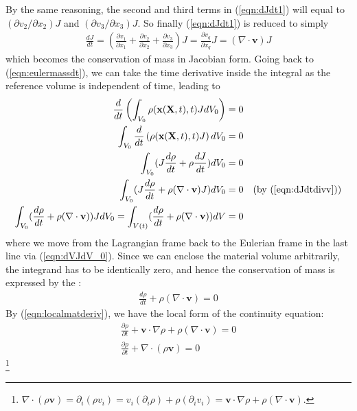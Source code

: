 By the same reasoning, the second and third terms in (\ref{eqn:dJdt1}) will equal to
$(\partial v_2/\partial x_2)J$ and $(\partial v_3/\partial x_3)J$. So finally (\ref{eqn:dJdt1}) is reduced to simply
\begin{align}
\frac{dJ}{dt} = \left(\frac{\partial v_1}{\partial x_1} + \frac{\partial v_2}{\partial x_2} + \frac{\partial v_3}{\partial x_3}\right) J = \frac{\partial v_q}{\partial x_q} J = (\nabla \cdot \textbf{v}) J \label{eqn:dJdtdivv}
\end{align}
which becomes the conservation of mass in Jacobian form. Going back to (\ref{eqn:eulermassdt}), we can take the time derivative inside the integral as the reference volume is independent of time, leading to
\begin{align}
\frac{d}{dt}\left(\int_{V_0} \rho(\textbf{x}(\textbf{X},t),t) JdV_0 \right) &= 0 \nonumber \\
\int_{V_0} \frac{d}{dt}\left(\rho(\textbf{x}(\textbf{X},t),t)J\right) dV_0  &= 0 \nonumber \\
\int_{V_0} (J \frac{d\rho}{dt} + \rho\frac{dJ}{dt}) dV_0 &= 0 \nonumber \\
\int_{V_0} (J \frac{d\rho}{dt} + \rho(\nabla \cdot \textbf{v})J) dV_0 &= 0 &\text{(by (\ref{eqn:dJdtdivv}))} \nonumber \\
\int_{V_0} (\frac{d\rho}{dt} + \rho(\nabla \cdot \textbf{v})) JdV_0 = \int_{V(t)}(\frac{d\rho}{dt} + \rho(\nabla \cdot \textbf{v}))dV &= 0
\end{align}
where we move from the Lagrangian frame back to the Eulerian frame in the last line via (\ref{eqn:dVJdV_0}). Since we can enclose the material volume arbitrarily, the integrand has to be identically zero, and hence the conservation of mass is expressed by the :
\begin{align}
\frac{d\rho}{dt} + \rho(\nabla \cdot \textbf{v}) = 0  \label{eqn:contineqn}
\end{align}
By (\ref{eqn:localmatderiv}), we have the local form of the continuity equation:
\begin{align}
\frac{\partial \rho}{\partial t} + \textbf{v} \cdot \nabla\rho + \rho(\nabla \cdot \textbf{v}) = 0  \nonumber \\
\frac{\partial \rho}{\partial t} + \nabla \cdot(\rho\textbf{v}) = 0 
\end{align}
\footnote{\label{footnote:divsv}$\nabla \cdot(\rho\textbf{v}) = \partial_i(\rho v_i) = v_i(\partial_i\rho) + \rho(\partial_iv_i) =  \textbf{v} \cdot \nabla\rho + \rho(\nabla \cdot \textbf{v})$.}
